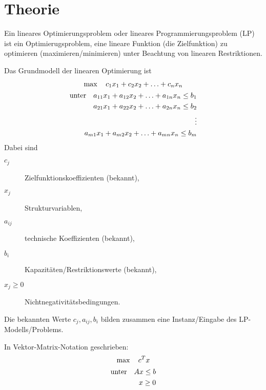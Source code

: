 \documentclass[
a4paper, %
11pt,
]
{scrartcl}
\begin{document}
\section{Theorie}%
\label{sec:theorie}

Ein lineares Optimierungsproblem oder lineares Programmierungsproblem (LP) ist
ein Optimierugsproblem, eine lineare Funktion (die Zielfunktion) zu optimieren
(maximieren/minimieren) unter Beachtung von linearen Restriktionen.

Das Grundmodell der linearen Optimierung ist
\begin{gather*}
  \max \quad c_1 x_1 + c_2 x_2 + \ldots + c_n x_n\\
  \begin{aligned}
    \textup{unter}
    \quad
    a_{11} x_1 + a_{12} x_2 + \ldots + a_{1n} x_n \leq b_1\\
    a_{21} x_1 + a_{22} x_2 + \ldots + a_{2n} x_n \leq b_2\\
    \vdots\\
    a_{m1} x_1 + a_{m2} x_2 + \ldots + a_{mn} x_n \leq b_m
  \end{aligned}
\end{gather*}
Dabei sind
\begin{description}
  \item[$c_j$] Zielfunktionskoeffizienten (bekannt),
  \item[$x_j$] Strukturvariablen,
  \item[$a_{ij}$] technische Koeffizienten (bekannt),
  \item[$b_i$] Kapazitäten/Restriktionswerte (bekannt),
  \item[$x_j \geq 0$] Nichtnegativitätsbedingungen.
\end{description}
Die bekannten Werte $c_j, a_{ij}, b_i$ bilden zusammen eine Instanz/Eingabe des
LP-Modells/Problems.

In Vektor-Matrix-Notation geschrieben:
\begin{gather*}
  \max \quad c^T x\\
  \begin{aligned}
    \textup{unter}
    \quad
    Ax \leq b\\
    x \geq 0
  \end{aligned}
\end{gather*}
\end{document}
